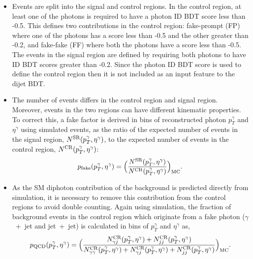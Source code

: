 \begin{itemize}
    \item Events are split into the signal and control regions. In the control region, at least one of the photons is required to have a photon ID BDT score less than -0.5. This defines two contributions in the control region: fake-prompt (FP) where one of the photons has a score less than -0.5 and the other greater than -0.2, and fake-fake (FF) where both the photons have a score less than -0.5. The events in the signal region are defined by requiring both photons to have ID BDT scores greater than -0.2. Since the photon ID BDT score is used to define the control region then it is not included as an input feature to the dijet BDT.
    
    \item The number of events differs in the control region and signal region. Moreover, events in the two regions can have different kinematic properties. To correct this, a fake factor is derived in bins of reconstructed photon $p_T^\gamma$ and $\eta^\gamma$ using simulated events, as the ratio of the expected number of events in the signal region, $N^{\rm{SR}}(p_T^\gamma,\eta^\gamma)$, to the expected number of events in the control region, $N^{\rm{CR}}(p_T^\gamma,\eta^\gamma)$:
    \begin{equation}
        p_{\rm{fake}}(p_T^\gamma,\eta^\gamma) = \Big(\frac{N^{\rm{SR}}(p_T^\gamma,\eta^\gamma)}{N^{\rm{CR}}(p_T^\gamma,\eta^\gamma)}\Big)_{\rm{MC}}.
    \end{equation}
    
    \item As the SM diphoton contribution of the background is predicted directly from simulation, it is necessary to remove this contribution from the control regions to avoid double counting. Again using simulation, the fraction of background events in the control region which originate from a fake photon ($\gamma$~+~jet and jet~+~jet) is calculated in bins of $p_T^{\gamma}$ and $\eta^\gamma$ as,
    \begin{equation}
        p_{\rm{QCD}}(p_T^\gamma,\eta^\gamma) = \Big(\frac{N_{\gamma j}^{\rm{CR}}(p_T^\gamma,\eta^\gamma)+N_{jj}^{\rm{CR}}(p_T^\gamma,\eta^\gamma)}{N_{\gamma\gamma}^{\rm{CR}}(p_T^\gamma,\eta^\gamma)+N_{\gamma j}^{\rm{CR}}(p_T^\gamma,\eta^\gamma)+N_{jj}^{\rm{CR}}(p_T^\gamma,\eta^\gamma)}\Big)_{\rm{MC}}.
    \end{equation}    
    

\end{itemize}
